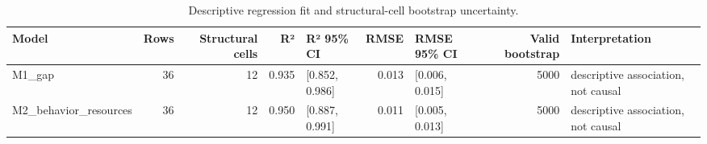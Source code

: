 \begin{table}[t]
\caption{Descriptive regression fit and structural-cell bootstrap uncertainty.}
\label{tab:gap-auc-fit}
\begin{tabular}{lrrrlrlrl}
\toprule
Model & Rows & Structural cells & R² & R² 95\% CI & RMSE & RMSE 95\% CI & Valid bootstrap & Interpretation \\
\midrule
M1\_gap & 36 & 12 & 0.935 & [0.852, 0.986] & 0.013 & [0.006, 0.015] & 5000 & descriptive association, not causal \\
M2\_behavior\_resources & 36 & 12 & 0.950 & [0.887, 0.991] & 0.011 & [0.005, 0.013] & 5000 & descriptive association, not causal \\
\bottomrule
\end{tabular}
\end{table}

